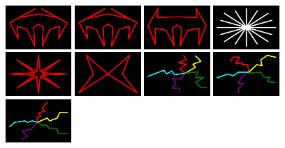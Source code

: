 \begin{figure}[H]
    \includegraphics[width=2.5cm]{preface/vector_images/vec_image_ener42.png}
    \includegraphics[width=2.5cm]{preface/vector_images/vec_image_ener43.png}
    \includegraphics[width=2.5cm]{preface/vector_images/vec_image_ener44.png}
    \includegraphics[width=2.5cm]{preface/vector_images/vec_image_expl1.png}
    \includegraphics[width=2.5cm]{preface/vector_images/vec_image_explop.png}
    \includegraphics[width=2.5cm]{preface/vector_images/vec_image_flipper.png}
    \includegraphics[width=2.5cm]{preface/vector_images/vec_image_fuse0.png}
    \includegraphics[width=2.5cm]{preface/vector_images/vec_image_fuse1.png}
    \includegraphics[width=2.5cm]{preface/vector_images/vec_image_fuse2.png}

\end{figure}
